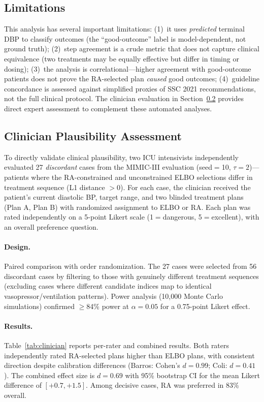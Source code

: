 \documentclass{article}
\begin{document}
\subsection{Limitations}

This analysis has several important limitations: (1)~it uses \emph{predicted} terminal DBP to classify outcomes (the ``good-outcome'' label is model-dependent, not ground truth); (2)~step agreement is a crude metric that does not capture clinical equivalence (two treatments may be equally effective but differ in timing or dosing); (3)~the analysis is correlational---higher agreement with good-outcome patients does not prove the RA-selected plan \emph{caused} good outcomes; (4)~guideline concordance is assessed against simplified proxies of SSC 2021 recommendations, not the full clinical protocol. The clinician evaluation in Section~\ref{sec:clinician_assessment} provides direct expert assessment to complement these automated analyses.


\subsection{Clinician Plausibility Assessment}
\label{sec:clinician_assessment}

To directly validate clinical plausibility, two ICU intensivists independently evaluated 27 \emph{discordant} cases from the MIMIC-III evaluation (seed$=$10, $\tau = 2$)---patients where the RA-constrained and unconstrained ELBO selections differ in treatment sequence (L1 distance $> 0$). For each case, the clinician received the patient's current diastolic BP, target range, and two blinded treatment plans (Plan A, Plan B) with randomized assignment to ELBO or RA. Each plan was rated independently on a 5-point Likert scale (1$=$dangerous, 5$=$excellent), with an overall preference question.

\paragraph{Design.} Paired comparison with order randomization. The 27 cases were selected from 56 discordant cases by filtering to those with genuinely different treatment sequences (excluding cases where different candidate indices map to identical vasopressor/ventilation patterns). Power analysis (10,000 Monte Carlo simulations) confirmed $\geq$84\% power at $\alpha = 0.05$ for a 0.75-point Likert effect.

\paragraph{Results.} Table~\ref{tab:clinician} reports per-rater and combined results. Both raters independently rated RA-selected plans higher than ELBO plans, with consistent direction despite calibration differences (Barros: Cohen's $d = 0.99$; Coli: $d = 0.41$). The combined effect size is $d = 0.69$ with 95\% bootstrap CI for the mean Likert difference of $[+0.7, +1.5]$. Among decisive cases, RA was preferred in 83\% overall.
\end{document}

